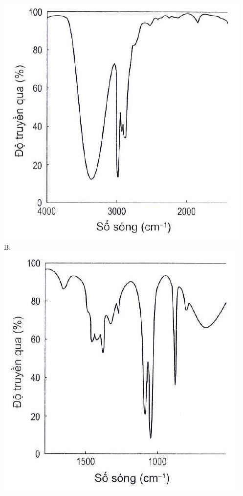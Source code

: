 \documentclass[10pt]{article}
\begin{document}
\includegraphics[max width=\textwidth, center]{2025_10_23_ae7aef68fb3b41082d29g-36}\\
B.\\
\includegraphics[max width=\textwidth, center]{2025_10_23_ae7aef68fb3b41082d29g-36(1)}
\end{document}
